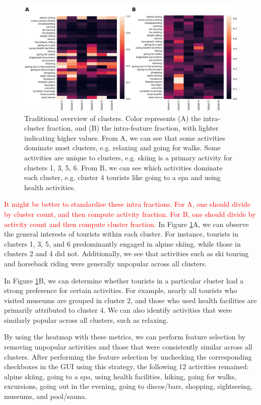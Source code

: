 \documentclass[article]{ajs}
\begin{document}
\begin{figure}[h!]
    \centering
    \includegraphics[width=1\textwidth]{winteractiv_heatmap.png}
    \caption{Traditional overview of clusters. Color represents (A) the intra-cluster fraction, and (B) the intra-feature fraction, with lighter indicating higher values. From A, we can see that some activities dominate most clusters, e.g. relaxing and going for walks. Some activities are unique to clusters, e.g. skiing is a primary activity for clusters 1, 3, 5, 6. From B, we can see which activities dominate each cluster, e.g. cluster 4 tourists like going to a spa and using health activities.}
    \label{fig:winteractiv_heatmap}
\end{figure}

\textcolor{red}{It might be better to standardise these intra fractions. For A, one should divide by cluster count, and then compute activity fraction. For B, one should divide by activity count and then compute cluster fraction.} In Figure \ref{fig:winteractiv_heatmap}A, we can observe the general interests of tourists within each cluster. For instance, tourists in clusters 1, 3, 5, and 6 predominantly engaged in alpine skiing, while those in clusters 2 and 4 did not. Additionally, we see that activities such as ski touring and horseback riding were generally unpopular across all clusters.

In Figure \ref{fig:winteractiv_heatmap}B, we can determine whether tourists in a particular cluster had a strong preference for certain activities. For example, nearly all tourists who visited museums are grouped in cluster 2, and those who used health facilities are primarily attributed to cluster 4. We can also identify activities that were similarly popular across all clusters, such as relaxing.

By using the heatmap with these metrics, we can perform feature selection by removing unpopular activities and those that were consistently similar across all clusters. After performing the feature selection by unchecking the corresponding checkboxes in the GUI using this strategy, the following 12 activities remained: alpine skiing, going to a spa, using health facilities, hiking, going for walks, excursions, going out in the evening, going to discos/bars, shopping, sightseeing, museums, and pool/sauna.
\end{document}
